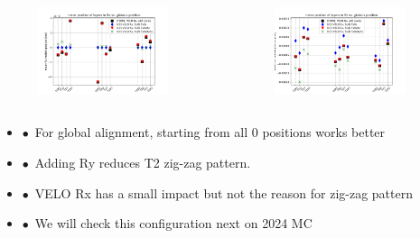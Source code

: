 \documentclass[aspectratio=1610, 12pt]{beamer}
\begin{document}
\begin{frame}
  \begin{columns}
    \begin{column}[c]{0.5\textwidth}
      \begin{figure}
        \includegraphics[width=0.9\textwidth]{plots/03-19/all_runs_rx_glob_z_vs_local_Rx.pdf}
      \end{figure}
    \end{column}
    \begin{column}[c]{0.5\textwidth}
      \begin{figure}
        \includegraphics[width=0.9\textwidth]{plots/03-19/all_runs_rx_glob_z_vs_local_Rz.pdf}
      \end{figure}
    \end{column}
  \end{columns}
\end{frame}

\begin{frame}
  \begin{itemize}
    \item $\bullet$\ For global alignment, starting from all 0 positions works better
    \item $\bullet$\ Adding Ry reduces T2 zig-zag pattern. 
    \item $\bullet$\ VELO Rx has a small impact but not the reason for zig-zag pattern
    \item $\bullet$\ We will check this configuration next on 2024 MC
  \end{itemize}
\end{frame}
\end{document}
